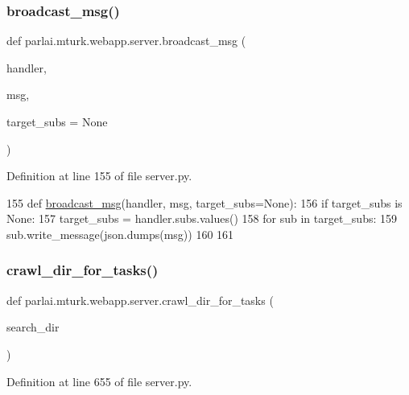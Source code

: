 \subsubsection{\texorpdfstring{broadcast\+\_\+msg()}{broadcast\_msg()}}
{\footnotesize\ttfamily def parlai.\+mturk.\+webapp.\+server.\+broadcast\+\_\+msg (\begin{DoxyParamCaption}\item[{}]{handler,  }\item[{}]{msg,  }\item[{}]{target\+\_\+subs = {\ttfamily None} }\end{DoxyParamCaption})}



Definition at line 155 of file server.\+py.


\begin{DoxyCode}
155 \textcolor{keyword}{def }\hyperlink{namespaceparlai_1_1mturk_1_1webapp_1_1server_aff248adb38d13b62a05e7d5649321d64}{broadcast\_msg}(handler, msg, target\_subs=None):
156     \textcolor{keywordflow}{if} target\_subs \textcolor{keywordflow}{is} \textcolor{keywordtype}{None}:
157         target\_subs = handler.subs.values()
158     \textcolor{keywordflow}{for} sub \textcolor{keywordflow}{in} target\_subs:
159         sub.write\_message(json.dumps(msg))
160 
161 
\end{DoxyCode}
\mbox{\label{namespaceparlai_1_1mturk_1_1webapp_1_1server_a0f5381b2282125d20fe12c40f6ed2ad3}} 
\subsubsection{\texorpdfstring{crawl\+\_\+dir\+\_\+for\+\_\+tasks()}{crawl\_dir\_for\_tasks()}}
{\footnotesize\ttfamily def parlai.\+mturk.\+webapp.\+server.\+crawl\+\_\+dir\+\_\+for\+\_\+tasks (\begin{DoxyParamCaption}\item[{}]{search\+\_\+dir }\end{DoxyParamCaption})}



Definition at line 655 of file server.\+py.



